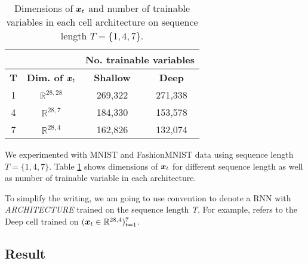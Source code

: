 \renewcommand{\arraystretch}{1.5}
\begin{table}[h]
\centering
\begin{tabular}{cc|c|c|}
\cline{3-4}
& & \multicolumn{2}{c|}{\textbf{No. trainable variables}}                                                                \\ \hline
\multicolumn{1}{|c|}{\textbf{T}}               & \multicolumn{1}{c|}{\textbf{Dim. of $\boldsymbol{x}_t$}} & \multicolumn{1}{c|}{\textbf{Shallow}} & \multicolumn{1}{c|}{\textbf{Deep}}  \\ \hline
\multicolumn{1}{|c|}{1} & $\mathbb{R}^{28,28}$ & 269,322  &  271,338 \\
\multicolumn{1}{|c|}{4} & $\mathbb{R}^{28,7}$ & 184,330 & 153,578 \\
\multicolumn{1}{|c|}{7} & $\mathbb{R}^{28,4}$ & 162,826 & 132,074 \\ \hline

\end{tabular}
\caption{Dimensions of $\patvector{x}_t$ and number of trainable variables in each cell architecture on sequence length $T=\{1, 4, 7\}$.}
\label{tab:seq-length}
\end{table}
\renewcommand{\arraystretch}{1}




We experimented with MNIST and FashionMNIST data using sequence length $T = \{1, 4, 7\}$.  Table \ref{tab:seq-length} shows dimensions of $\patvector{x}_t$ for different sequence length as well as number of trainable variable in each architecture.

To simplify the writing, we am going to use \textit{} convention to denote a RNN with \textit{ARCHITECTURE} trained on the sequence length \textit{T}. For example,  refers to the Deep cell trained on $(\boldsymbol{x}_t \in \mathbb{R}^{28,4} )_{t=1}^{7}$.

\subsection{Result}


